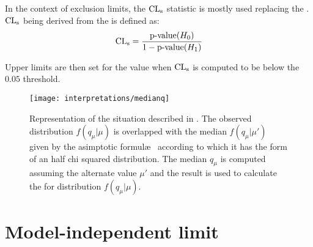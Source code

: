 In the context of exclusion limits, the $\text{CL}_\textup{s}$ statistic is mostly used replacing the \p. $\text{CL}_\textup{s}$ being derived from the \p is defined as:
\begin{equation}
	\text{CL}_\textup{s}=\frac{\text{p-value}(H_0)}{1-\text{p-value}(H_1)}
\end{equation}

Upper limits are then set for the value when $\text{CL}_\textup{s}$ is computed to be below the $0.05$ threshold.

\begin{figure}[pt]
\centering
\texttt{[image: interpretations/medianq]}
\caption{Representation of the situation described in \Sect{\ref{sec:sensitivity}}. The observed distribution $f\left(q_\mu \vert \mu \right)$ is overlapped with the median $f\left(q_\mu \vert \mu' \right)$ given by the asimptotic formul\ae~ according to which it has the form of an half chi squared distribution. The median $q_\mu$ is computed assuming the alternate value $\mu'$ and the result is used to calculate the \p for distribution $f\left(q_\mu \vert \mu \right)$.}
\label{fig:medianq}
\end{figure}

\section{Model-independent limit}

%


